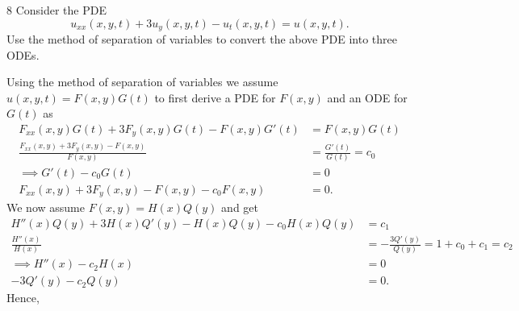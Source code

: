 
\begin{problem}{8}
  Consider the PDE
  \begin{equation*}
    u_{x x}(x,y,t) + 3u_{y}(x,y,t) - u_t(x,y,t) = u(x,y,t)
  .\end{equation*}
  Use the method of separation of variables to convert the above PDE into three ODEs.
\end{problem}

\begin{derivation}
  Using the method of separation of variables we assume $u(x,y,t) = F(x,y) G(t) $ to first derive a PDE for $F(x,y)$ and an ODE for $G(t)$ as
  \begin{align*}
    F_{x x}(x,y) G(t) + 3 F_{y}(x,y) G(t) - F(x,y) G'(t) &= F(x,y)G(t) \\
    \frac{F_{x x}(x,y) + 3 F_y(x,y) - F(x,y)}{F(x,y)} &= \frac{G'(t)}{G(t)} = c_0 \\
    \implies G'(t) - c_0 G(t) &= 0 \\
    F_{x x}(x,y) + 3 F_y(x,y) - F(x,y) - c_0 F(x,y) &= 0
  .\end{align*}
  We now assume $F(x,y) = H(x) Q(y)$ and get
  \begin{align*}
    H''(x) Q(y) + 3 H(x) Q'(y) - H(x) Q(y) - c_0 H(x) Q(y) &= c_1 \\
    \frac{H''(x)}{H(x)} &= -\frac{3Q'(y)}{Q(y)} = 1 + c_0 + c_1 = c_2 \\
    \implies H''(x) - c_2 H(x) &= 0 \\
    - 3 Q'(y) - c_2 Q(y) &= 0
  .\end{align*}
  Hence,
\end{derivation}

  
